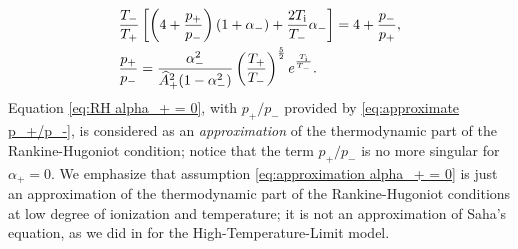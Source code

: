 \documentclass[10pt,a4paper]{article}
\numberwithin{equation}{section}
\newcommand{\Ti}{T_{\rm i}}
\begin{document}
\begin{align}\label{eq:RH alpha_+ = 0}
&  \frac{T_-}{T_+}\left[\left(4 + \frac{p_+}{p_-}\right)(1 + \alpha_-) +  \frac{2\Ti}{T_{-}}\alpha_-\right] 
=  4 + \frac{p_-}{p_+},
\\
&\frac{p_+}{p_-} 
= \frac{\alpha_-^2}{\widehat{A}_+^2(1 - \alpha_-^2)} \left(\frac{T_{+}}{T_{-}}\right)^{\frac{5}{2}} e^{\frac{\Ti}{T_{-}}}. 
\label{eq:approximate p_+/p_-}
\end{align}
Equation \eqref{eq:RH alpha_+ = 0}, with $p_+/p_-$ provided by \eqref{eq:approximate p_+/p_-}, is considered as an {\em approximation} of the thermodynamic part of the Rankine-Hugoniot condition; notice that the term $p_+/p_-$ is no more singular for $\alpha_+=0$. We emphasize that assumption \eqref{eq:approximation alpha_+ = 0} is just an approximation of the thermodynamic part of the Rankine-Hugoniot conditions at low degree of ionization and temperature; it is not an approximation of Saha's equation, as we did in \cite{Asakura-Corli_ionized} for the High-Temperature-Limit model.
\end{document}

